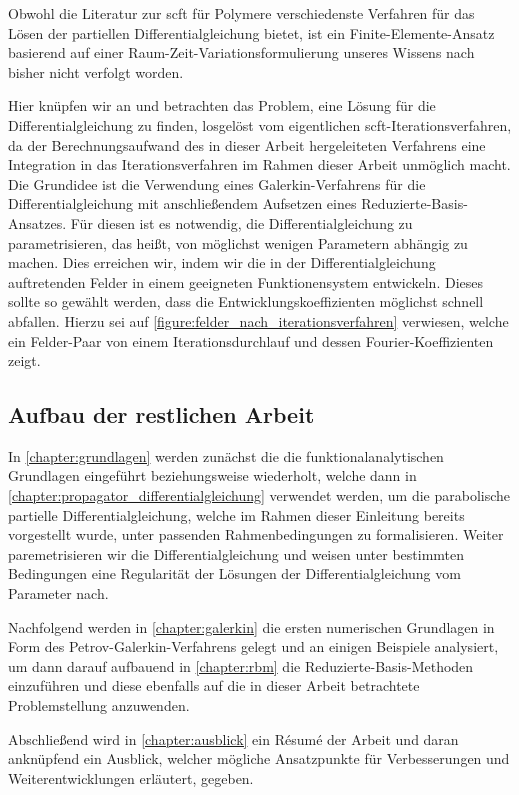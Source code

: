 Obwohl die Literatur zur \ac{scft} für Polymere verschiedenste Verfahren für das Lösen der partiellen Differentialgleichung bietet, ist ein Finite-Elemente-Ansatz basierend auf einer Raum-Zeit-Variationsformulierung unseres Wissens nach bisher nicht verfolgt worden.

Hier knüpfen wir an und betrachten das Problem, eine Lösung für die Differentialgleichung zu finden, losgelöst vom eigentlichen \ac{scft}-Iterationsverfahren, da der Berechnungsaufwand des in dieser Arbeit hergeleiteten Verfahrens eine Integration in das Iterationsverfahren im Rahmen dieser Arbeit unmöglich macht.
Die Grundidee ist die Verwendung eines Galerkin-Verfahrens für die Differentialgleichung mit anschließendem Aufsetzen eines Reduzierte-Basis-Ansatzes.
Für diesen ist es notwendig, die Differentialgleichung zu parametrisieren, das heißt, von möglichst wenigen Parametern abhängig zu machen.
Dies erreichen wir, indem wir die in der Differentialgleichung auftretenden Felder in einem geeigneten Funktionensystem entwickeln.
Dieses sollte so gewählt werden, dass die Entwicklungskoeffizienten möglichst schnell abfallen.
Hierzu sei auf \cref{figure:felder_nach_iterationsverfahren} verwiesen, welche ein Felder-Paar von einem Iterationsdurchlauf und dessen Fourier-Koeffizienten zeigt.


\subsection*{Aufbau der restlichen Arbeit}

In \cref{chapter:grundlagen} werden zunächst die die funktionalanalytischen Grundlagen eingeführt beziehungsweise wiederholt, welche dann in \cref{chapter:propagator_differentialgleichung} verwendet werden, um die parabolische partielle Differentialgleichung, welche im Rahmen dieser Einleitung bereits vorgestellt wurde, unter passenden Rahmenbedingungen zu formalisieren.
Weiter paremetrisieren wir die Differentialgleichung und weisen unter bestimmten Bedingungen eine Regularität der Lösungen der Differentialgleichung vom Parameter nach.

Nachfolgend werden in \cref{chapter:galerkin} die ersten numerischen Grundlagen in Form des Petrov-Galerkin-Verfahrens gelegt und an einigen Beispiele analysiert, um dann darauf aufbauend in \cref{chapter:rbm} die Reduzierte-Basis-Methoden einzuführen und diese ebenfalls auf die in dieser Arbeit betrachtete Problemstellung anzuwenden.

Abschließend wird in \cref{chapter:ausblick} ein Résumé der Arbeit und daran anknüpfend ein Ausblick, welcher mögliche Ansatzpunkte für Verbesserungen und Weiterentwicklungen erläutert, gegeben.


